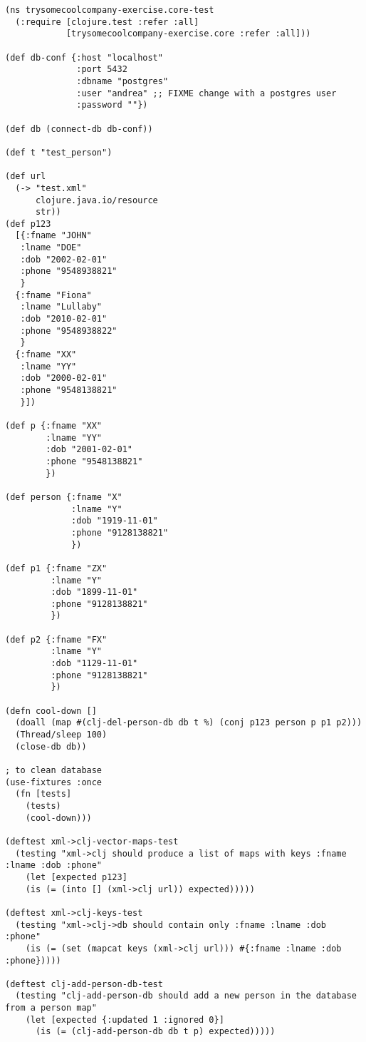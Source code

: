 \documentclass[11pt]{article}
\begin{document}
\begin{verbatim}
(ns trysomecoolcompany-exercise.core-test
  (:require [clojure.test :refer :all]
            [trysomecoolcompany-exercise.core :refer :all]))

(def db-conf {:host "localhost" 
              :port 5432 
              :dbname "postgres" 
              :user "andrea" ;; FIXME change with a postgres user 
              :password ""})

(def db (connect-db db-conf))

(def t "test_person")

(def url 
  (-> "test.xml"
      clojure.java.io/resource
      str))
(def p123
  [{:fname "JOHN" 
   :lname "DOE" 
   :dob "2002-02-01"
   :phone "9548938821"
   } 
  {:fname "Fiona"
   :lname "Lullaby"
   :dob "2010-02-01"
   :phone "9548938822"
   }
  {:fname "XX"
   :lname "YY"
   :dob "2000-02-01"
   :phone "9548138821"
   }])

(def p {:fname "XX"
        :lname "YY"
        :dob "2001-02-01"
        :phone "9548138821"
        })

(def person {:fname "X"
             :lname "Y"
             :dob "1919-11-01"
             :phone "9128138821"
             })

(def p1 {:fname "ZX"
         :lname "Y"
         :dob "1899-11-01"
         :phone "9128138821"
         })

(def p2 {:fname "FX"
         :lname "Y"
         :dob "1129-11-01"
         :phone "9128138821"
         })

(defn cool-down [] 
  (doall (map #(clj-del-person-db db t %) (conj p123 person p p1 p2)))
  (Thread/sleep 100)
  (close-db db))

; to clean database
(use-fixtures :once
  (fn [tests]
    (tests)
    (cool-down)))

(deftest xml->clj-vector-maps-test
  (testing "xml->clj should produce a list of maps with keys :fname :lname :dob :phone"
    (let [expected p123]
    (is (= (into [] (xml->clj url)) expected)))))

(deftest xml->clj-keys-test
  (testing "xml->clj->db should contain only :fname :lname :dob :phone"
    (is (= (set (mapcat keys (xml->clj url))) #{:fname :lname :dob :phone}))))

(deftest clj-add-person-db-test
  (testing "clj-add-person-db should add a new person in the database from a person map"
    (let [expected {:updated 1 :ignored 0}]
      (is (= (clj-add-person-db db t p) expected)))))


\end{verbatim}
\end{document}
